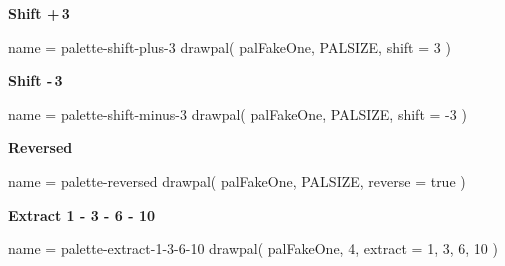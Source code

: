 \documentclass[theme = dark]{tutodoc}
\begin{document}

\bigskip
\bigskip

{\Large\bfseries Shift +\,3}

\smallskip

\begin{luadraw}{name = palette-shift-plus-3}
drawpal(
  palFakeOne, PALSIZE,
  {shift = 3}
)
\end{luadraw}


\bigskip
\bigskip

{\Large\bfseries Shift -\,3}

\smallskip

\begin{luadraw}{name = palette-shift-minus-3}
drawpal(
  palFakeOne, PALSIZE,
  {shift = -3}
)
\end{luadraw}



\bigskip
\bigskip

{\Large\bfseries Reversed}

\smallskip

\begin{luadraw}{name = palette-reversed}
drawpal(
  palFakeOne, PALSIZE,
  {reverse = true}
)
\end{luadraw}



\bigskip
\bigskip

{\Large\bfseries Extract 1 - 3 - 6 - 10}

\smallskip

\begin{luadraw}{name = palette-extract-1-3-6-10}
drawpal(
  palFakeOne, 4,
  {extract = {1, 3, 6, 10}}
)
\end{luadraw}
\end{document}
